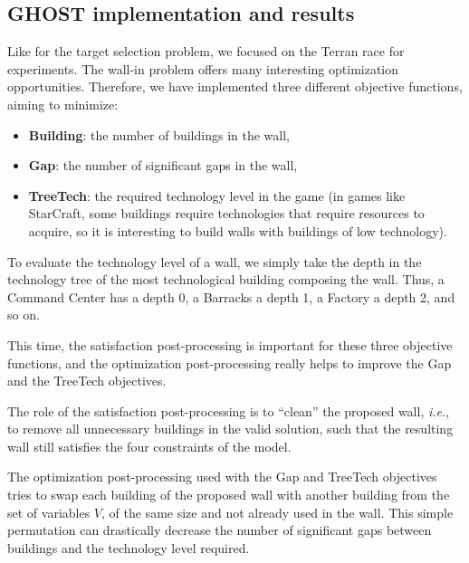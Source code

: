 \documentclass{article}
\newcommand{\ghost}{\textsc{GHOST}\xspace}
\newcommand{\ie}{\textit{i.e.}}
\begin{document}
\subsection{\ghost implementation and results}

Like for the  target selection problem, we focused on  the Terran race
for  experiments.    The  wall-in  problem  offers   many  interesting
optimization  opportunities.   Therefore,  we have  implemented  three
different objective functions, aiming to minimize:
\begin{itemize}
\item {\bf Building}: the number of buildings in the wall,
\item {\bf Gap}: the number of significant gaps in the wall,
\item {\bf  TreeTech}: the required  technology level in the  game (in
  games  like  StarCraft,  some buildings  require  technologies  that
  require resources  to acquire, so  it is interesting to  build walls
  with buildings of low technology).
\end{itemize}

To evaluate the  technology level of a wall, we  simply take the depth
in the  technology tree of  the most technological  building composing
the wall. Thus, a Command Center has  a depth 0, a Barracks a depth 1,
a Factory a depth 2, and so on.

This  time, the  satisfaction post-processing  is important  for these
three objective functions, and the optimization post-processing really
helps to improve the Gap and the TreeTech objectives.

The  role of  the  satisfaction post-processing  is  to ``clean''  the
proposed wall, \ie,  to remove all unnecessary buildings  in the valid
solution,  such  that the  resulting  wall  still satisfies  the  four
constraints of the model.

The  optimization  post-processing  used  with the  Gap  and  TreeTech
objectives  tries to  swap each  building  of the  proposed wall  with
another building from  the set of variables $V$, of  the same size and
not already used in the  wall. This simple permutation can drastically
decrease  the number  of significant  gaps between  buildings and  the
technology level required.
\end{document}
